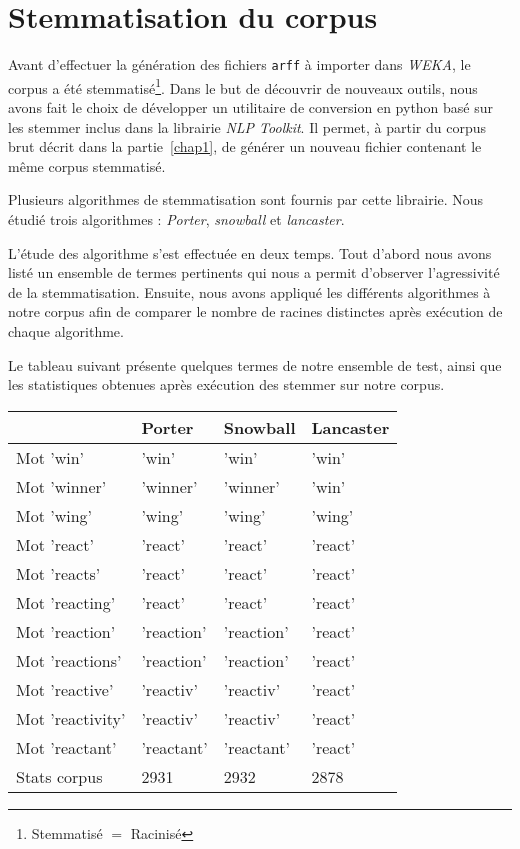 \section{Stemmatisation du corpus}
Avant d'effectuer la génération des fichiers \texttt{arff} à importer dans \textit{WEKA}, le corpus a été stemmatisé\footnote{Stemmatisé $=$ Racinisé}. Dans le but de découvrir de nouveaux outils, nous avons fait le choix de développer un utilitaire de conversion en python basé sur les stemmer  inclus dans la librairie \textit{NLP Toolkit}. Il permet, à partir du corpus brut décrit dans la partie~\vref{chap1}, de générer un nouveau fichier contenant le même corpus stemmatisé.

Plusieurs algorithmes de stemmatisation sont fournis par cette librairie. Nous étudié trois algorithmes : \textit{Porter}, \textit{snowball} et \textit{lancaster}.

L'étude des algorithme s'est effectuée en deux temps. Tout d'abord nous avons listé un ensemble de termes pertinents qui nous a permit d'observer l'agressivité de la stemmatisation. Ensuite, nous avons appliqué les différents algorithmes à notre corpus afin de comparer le nombre de racines distinctes après exécution de chaque algorithme.

Le tableau suivant présente quelques termes de notre ensemble de test, ainsi que les statistiques obtenues après exécution des stemmer sur notre corpus.

\begin{tabular}{l l l l}
				& \textbf{Porter}	& \textbf{Snowball}	& \textbf{Lancaster} \\
\hline
Mot 'win'		& 'win'				& 'win'				& 'win' \\
Mot 'winner'	& 'winner'			& 'winner'			& 'win' \\
Mot 'wing'		& 'wing'			& 'wing'			& 'wing' \\
\hline
Mot 'react'		& 'react'			& 'react'			& 'react' \\
Mot 'reacts'	& 'react'			& 'react'			& 'react' \\
Mot 'reacting'	& 'react'			& 'react'			& 'react' \\
Mot 'reaction'	& 'reaction'		& 'reaction'		& 'react' \\
Mot 'reactions'	& 'reaction'		& 'reaction'		& 'react' \\
Mot 'reactive'	& 'reactiv'			& 'reactiv'			& 'react' \\
Mot 'reactivity'& 'reactiv'			& 'reactiv'			& 'react' \\
Mot 'reactant'	& 'reactant'		& 'reactant'		& 'react' \\
\hline
\hline
Stats corpus 	& 2931				& 2932 				& 2878 \\
\end{tabular}

